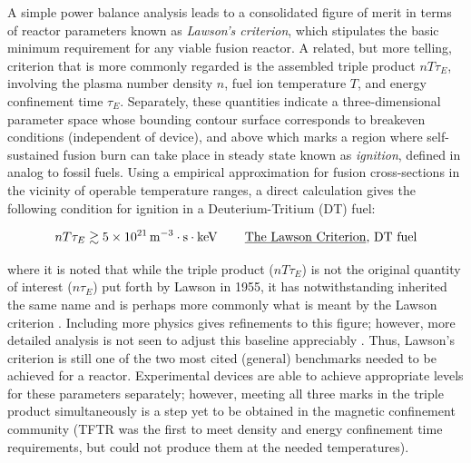\documentclass[11pt,titlepage]{report}
\begin{document}
A simple power balance analysis leads to a consolidated figure of merit in terms of reactor parameters known as \emph{Lawson's criterion}, which stipulates the basic minimum requirement for any viable fusion reactor. A related, but more telling, criterion that is more commonly regarded is the assembled triple product $nT\tau_E$, involving the plasma number density $n$, fuel ion temperature $T$, and energy confinement time $\tau_E$. Separately, these quantities indicate a three-dimensional parameter space whose bounding contour surface corresponds to breakeven conditions (independent of device), and above which marks a region where self-sustained fusion burn can take place in steady state known as \emph{ignition}, defined in analog to fossil fuels. Using a empirical approximation for fusion cross-sections in the vicinity of operable temperature ranges, a direct calculation gives the following condition for ignition in a Deuterium-Tritium (DT) fuel:

$$nT\tau_E \gtrsim 5 \times 10^{21} \, \mathrm{m^{-3}\cdot s\cdot keV}\, \qquad \textrm{\underline{The Lawson Criterion}, DT fuel}$$


\noindent where it is noted that while the triple product ($nT\tau_E$) is not the original quantity of interest ($n\tau_E$) put forth by Lawson in 1955, it has notwithstanding inherited the same name and is perhaps more commonly what is meant by the Lawson criterion . Including more physics gives refinements to this figure; however, more detailed analysis is not seen to adjust this baseline appreciably \cite{Wesson}. Thus, Lawson's criterion is still one of the two most cited (general) benchmarks needed to be achieved for a reactor. Experimental devices are able to achieve appropriate levels for these parameters separately; however, meeting all three marks in the triple product simultaneously is a step yet to be obtained in the magnetic confinement community (TFTR was the first to meet density and energy confinement time requirements, but could not produce them at the needed temperatures).
\end{document}
